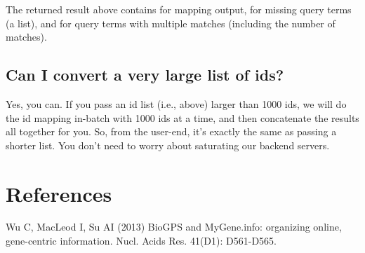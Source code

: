 \documentclass[12pt]{article}
\begin{document}
\begin{Schunk}
\end{Schunk}

The returned result above contains  for mapping output,  for missing query terms (a list), and  for query terms with multiple matches (including the number of matches).

\subsection{Can I convert a very large list of ids?}

Yes, you can. If you pass an id list (i.e.,  above) larger than 1000 ids, we will do the id mapping in-batch with 1000 ids at a time, and then concatenate the results all together for you. So, from the user-end, it's exactly the same as passing a shorter list. You don't need to worry about saturating our backend servers.

\section{References}
Wu C, MacLeod I, Su AI (2013) BioGPS and MyGene.info: organizing online, gene-centric information. Nucl. Acids Res. 41(D1): D561-D565.
\end{document}
